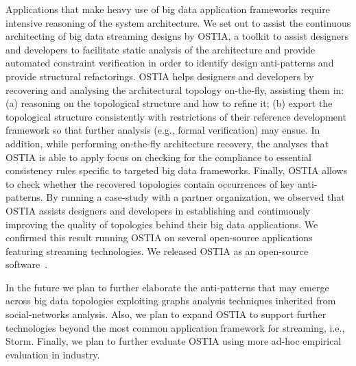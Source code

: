 Applications that make heavy use of big data application frameworks require intensive reasoning of the system architecture. We set out to assist the continuous architecting of big data streaming designs by OSTIA, a toolkit to assist designers and developers to facilitate static analysis of the architecture and provide automated constraint verification in order to identify design anti-patterns and provide structural refactorings. OSTIA helps designers and developers by recovering and analysing the architectural topology on-the-fly, assisting them in: (a) reasoning on the topological structure and how to refine it; (b) export the topological structure consistently with restrictions of their reference development framework so that further analysis (e.g., formal verification) may ensue. In addition, while performing on-the-fly architecture recovery, the analyses that OSTIA is able to apply focus on checking for the compliance to essential consistency rules specific to targeted big data frameworks. Finally, OSTIA allows to check whether the recovered topologies contain occurrences of key anti-patterns. By running a case-study with a partner organization, we observed that OSTIA assists designers and developers in establishing and continuously improving the quality of topologies behind their big data applications. We confirmed this result running OSTIA on several open-source applications featuring streaming technologies. We released OSTIA as an open-source software~\cite{ostia}. %
 
In the future we plan to further elaborate the anti-patterns that may emerge across big data topologies exploiting graphs analysis techniques inherited from social-networks analysis. Also, we plan to expand OSTIA to support further technologies beyond the most common application framework for streaming, i.e., Storm. Finally, we plan to further evaluate OSTIA using more ad-hoc empirical evaluation in industry.